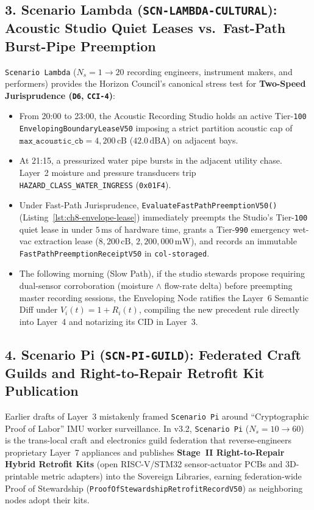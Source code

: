 \subsection{3. Scenario Lambda (\texttt{SCN-LAMBDA-CULTURAL}): Acoustic Studio Quiet Leases vs.\ Fast-Path Burst-Pipe Preemption}
\texttt{Scenario Lambda} ($N_s = 1 \to 20$ recording engineers, instrument makers, and performers) provides the Horizon Council's canonical stress test for \textbf{Two-Speed Jurisprudence (\texttt{D6}, \texttt{CCI-4})}:
\begin{itemize}
    \item From 20:00 to 23:00, the Acoustic Recording Studio holds an active Tier-\texttt{100} \texttt{EnvelopingBoundaryLeaseV50} imposing a strict partition acoustic cap of $\texttt{max\_acoustic\_cb} = 4{,}200\,\mathrm{cB}$ ($42.0\,\mathrm{dBA}$) on adjacent bays.
    \item At 21:15, a pressurized water pipe bursts in the adjacent utility chase. Layer~2 moisture and pressure transducers trip \texttt{HAZARD\_CLASS\_WATER\_INGRESS} (\texttt{0x01F4}).
    \item Under Fast-Path Jurisprudence, \texttt{EvaluateFastPathPreemptionV50()} (Listing~\ref{lst:ch8-envelope-lease}) immediately preempts the Studio's Tier-\texttt{100} quiet lease in under $5\,\mathrm{ms}$ of hardware time, grants a Tier-\texttt{990} emergency wet-vac extraction lease ($8{,}200\,\mathrm{cB}$, $2{,}200{,}000\,\mathrm{mW}$), and records an immutable \texttt{FastPathPreemptionReceiptV50} in \texttt{col-storaged}.
    \item The following morning (Slow Path), if the studio stewards propose requiring dual-sensor corroboration (moisture $\land$ flow-rate delta) before preempting master recording sessions, the Enveloping Node ratifies the Layer~6 Semantic Diff under $V_i(t) = 1 + R_i(t)$, compiling the new precedent rule directly into Layer~4 and notarizing its CID in Layer~3.
\end{itemize}

\subsection{4. Scenario Pi (\texttt{SCN-PI-GUILD}): Federated Craft Guilds and Right-to-Repair Retrofit Kit Publication}
Earlier drafts of Layer~3 mistakenly framed \texttt{Scenario Pi} around ``Cryptographic Proof of Labor'' IMU worker surveillance. In v3.2, \texttt{Scenario Pi} ($N_s = 10 \to 60$) is the trans-local craft and electronics guild federation that reverse-engineers proprietary Layer~7 appliances and publishes \textbf{Stage~II Right-to-Repair Hybrid Retrofit Kits} (open RISC-V/STM32 sensor-actuator PCBs and 3D-printable metric adapters) into the Sovereign Libraries, earning federation-wide Proof of Stewardship (\texttt{ProofOfStewardshipRetrofitRecordV50}) as neighboring nodes adopt their kits.

